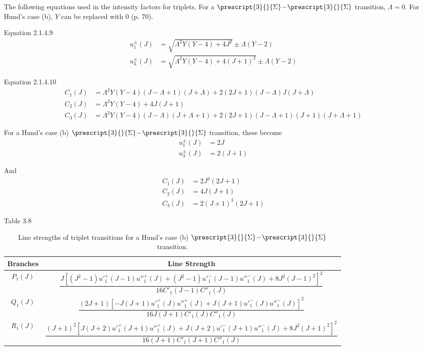 \documentclass[11pt, twoside, fleqn]{report}
\newcommand{\dash}{\!-\!}
\newcommand{\state}[2]{\prescript{#1}{}{#2}}
\begin{document}
The following equations used in the intensity factors for triplets. For a $\state{3}{\Sigma}\dash\state{3}{\Sigma}$ transition, $\Lambda = 0$. For Hund's case (b), $Y$ can be replaced with $0$ (p. 70).

Equation 2.1.4.9
\begin{align*}
    u_1^\pm(J) &= \sqrt{\Lambda^2Y(Y - 4) + 4J^2} \pm \Lambda(Y - 2) \\
    u_3^\pm(J) &= \sqrt{\Lambda^2Y(Y - 4) + 4(J + 1)^2} \pm \Lambda(Y - 2)
\end{align*}

Equation 2.1.4.10
\begin{align*}
    C_1(J) &= \Lambda^2Y(Y - 4)(J - \Lambda + 1)(J + \Lambda) + 2(2J + 1)(J - \Lambda)J(J + \Lambda) \\
    C_2(J) &= \Lambda^2Y(Y - 4) + 4J(J + 1) \\
    C_3(J) &= \Lambda^2Y(Y - 4)(J - \Lambda)(J + \Lambda + 1) + 2(2J + 1)(J - \Lambda + 1)(J + 1)(J + \Lambda + 1)
\end{align*}

For a Hund's case (b) $\state{3}{\Sigma}\dash\state{3}{\Sigma}$ transition, these become
\begin{align*}
    u_1^\pm(J) &= 2J \\
    u_3^\pm(J) &= 2(J + 1)
\end{align*}

And
\begin{align*}
    C_1(J) &= 2J^3(2J + 1) \\
    C_2(J) &= 4J(J + 1) \\
    C_3(J) &= 2(J + 1)^3(2J + 1)
\end{align*}

Table 3.8
\begin{table}[H]
    \centering
    \caption{Line strengths of triplet transitions for a Hund's case (b) $\state{3}{\Sigma}\dash\state{3}{\Sigma}$ transition.}
    \begin{tabular}{cc}
        \toprule
        Branches & Line Strength \\
        \midrule
        $P_1(J)$ & $\dfrac{J[(J^2 - 1)u'^+_1(J - 1)u''^+_1(J) + (J^2 - 1)u'^-_1(J - 1)u''^-_1(J) + 8J^2(J - 1)^2]^2}{16C'_1(J - 1)C''_1(J)}$ \\
        \addlinespace[0.5em]
        $Q_1(J)$ & $\dfrac{(2J + 1)[-J(J + 1)u'^+_1(J)u''^+_1(J) + J(J + 1)u'^-_1(J)u''^-_1(J)]^2}{16J(J + 1)C'_1(J)C''_1(J)}$ \\
        \addlinespace[0.5em]
        $R_1(J)$ & $\dfrac{(J + 1)^2[J(J + 2)u'^+_1(J + 1)u''^+_1(J) + J(J + 2)u'^-_1(J + 1)u''^-_1(J) + 8J^2(J + 1)^2]^2}{16(J + 1)C'_1(J + 1)C''_1(J)}$ \\
        \bottomrule
    \end{tabular}
\end{table}
\end{document}
